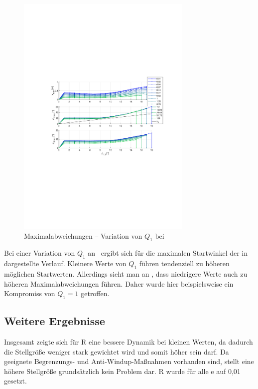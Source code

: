 \begin{figure}[tbp]
	\centering
		\includegraphics[width=0.75\textwidth]{Bilder/QRVariation/ap4/q1 phi1 m.pdf}
	\caption{Maximalabweichungen -- Variation von $Q_1$ bei \apv}
	\label{fig:qrap4q1m}
\end{figure}

Bei einer Variation von $Q_1$ an \apv\ ergibt sich für die maximalen Startwinkel der in  dargestellte Verlauf.
Kleinere Werte von $Q_1$ führen tendenziell zu höheren möglichen Startwerten.
Allerdings sieht man an , dass niedrigere Werte auch zu höheren Maximalabweichungen führen.
Daher wurde hier beispielsweise ein Kompromiss von $Q_1=1$ getroffen.


\subsection{Weitere Ergebnisse}

Insgesamt zeigte sich für R eine bessere Dynamik bei kleinen Werten, da dadurch die Stellgröße weniger stark gewichtet wird und somit höher sein darf.
Da geeignete Begrenzungs- und Anti-Windup-Maßnahmen vorhanden sind, stellt eine höhere Stellgröße grundsätzlich kein Problem dar.
R wurde für alle \ap e auf 0,01 gesetzt.

